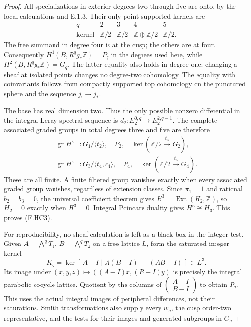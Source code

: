 \begin{proof}
All specializations in exterior degrees two through
five are onto, by the local calculations and E.1.3.
Their only point-supported kernels are
\[
\begin{array}{c|cccc}
q&2&3&4&5\\ \hline
\text{kernel}&\mathbb Z/2&\mathbb Z/2&
                 \mathbb Z\oplus\mathbb Z/2&\mathbb Z/2 .
\end{array}
\tag{F.HC9}
\]
The free summand in degree four is at the cusp; the
others are at four.
Consequently $H^1(B,R^qg_*\mathbb Z)=P_q$ in the
degrees used here, while
$H^2(B,R^qg_*\mathbb Z)=G_q$.
The latter equality also holds in degree one:
changing a sheaf at isolated points changes no
degree-two cohomology.  The equality with coinvariants
follows from compactly supported top cohomology on
the punctured sphere and the sequence $j_!\to j_*$.

The base has real dimension two.
Thus the only possible nonzero differential in the
integral Leray spectral sequence is
$d_2:E_2^{0,q}\to E_2^{2,q-1}$.
The complete associated graded groups in total
degrees three and five are therefore
\[
\begin{split}
 \operatorname{gr}H^3&:
   G_1/\langle t_2\rangle,\quad P_2,\quad
   \ker(\mathbb Z/2\xrightarrow{\,t_3\,}G_2),\\
 \operatorname{gr}H^5&:
   G_3/\langle t_4,c_4\rangle,\quad P_4,\quad
   \ker(\mathbb Z/2\xrightarrow{\,t_5\,}G_4).
\end{split}
\tag{F.HC10}
\]
These are all finite.  A finite filtered group
vanishes exactly when every associated graded group
vanishes, regardless of extension classes.
Since $\pi_1=1$ and rational $b_2=b_3=0$, the universal
coefficient theorem gives
$H^3=\operatorname{Ext}(H_2,\mathbb Z)$, so
$H_2=0$ exactly when $H^3=0$.
Integral Poincare duality gives $H^5\cong H_3$.
This proves (F.HC3).

For reproducibility, no sheaf calculation is left
as a black box in the integer test.
Given $A=\bigwedge^qT_1$, $B=\bigwedge^qT_2$ on a
free lattice $L$, form the saturated integer kernel
\[
 K_q=\ker[\,A-I\mid A(B-I)\mid -(AB-I)\,]\subset L^3.
 \tag{F.HC11}
\]
Its image under
$(x,y,z)\mapsto((A-I)x,(B-I)y)$ is precisely the
integral parabolic cocycle lattice.
Quotient by the columns of
$\left(\begin{smallmatrix}A-I\\B-I\end{smallmatrix}\right)$
to obtain $P_q$.
This uses the actual integral images of peripheral
differences, not their saturations.
Smith transformations also supply every $w_q$, the
cusp order-two representative, and the tests for
their images and generated subgroups in $G_q$.


\end{proof}
